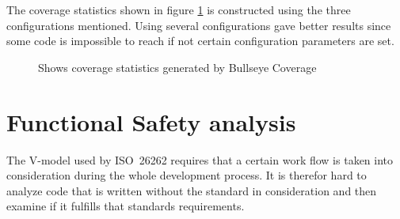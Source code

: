 The coverage statistics shown in figure \ref{FIG:BULLSEYE} is
constructed using the three configurations mentioned. Using several configurations
gave better results since some code is impossible to reach if not
certain configuration parameters are set.

\begin{figure}[!ht]
  \setlength\fboxsep{0pt}
  \setlength\fboxrule{0.5pt}
  \caption{Shows coverage statistics generated by Bullseye Coverage}
  \label{FIG:BULLSEYE}
\end{figure}


\section{Functional Safety analysis}
The V-model used by ISO~26262 requires that a certain work flow is
taken into consideration during the whole development process. It is
therefor hard to analyze code that is written without the standard in
consideration and then examine if it fulfills that standards
requirements.


